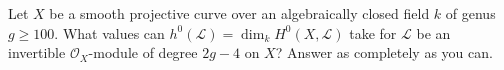 \begin{exercise}
\label{exercise-sections-degree-2g-minus-4}
Let $X$ be a smooth projective curve over an algebraically closed field
$k$ of genus $g \geq 100$. What values can
$h^0(\mathcal{L}) = \dim_k H^0(X, \mathcal{L})$ take for
$\mathcal{L}$ be an invertible $\mathcal{O}_X$-module of degree $2g - 4$
on $X$? Answer as completely as you can.
\end{exercise}
















